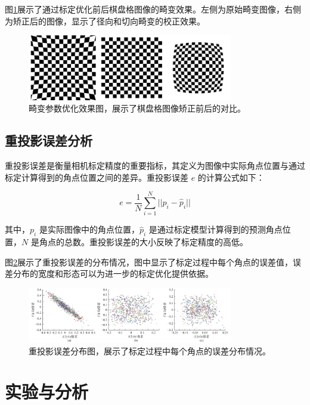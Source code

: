 \documentclass[hyperref,a4paper,UTF8]{ctexart}
\begin{document}
图\ref{fig:distortion_correction}展示了通过标定优化前后棋盘格图像的畸变效果。左侧为原始畸变图像，右侧为矫正后的图像，显示了径向和切向畸变的校正效果。

\begin{figure}[h]
    \centering
    \includegraphics[width=0.8\textwidth]{assets/checkerboard_distort_compare.png}
    \caption{畸变参数优化效果图，展示了棋盘格图像矫正前后的对比。}
    \label{fig:distortion_correction}
\end{figure}

\subsection{重投影误差分析}

重投影误差是衡量相机标定精度的重要指标，其定义为图像中实际角点位置与通过标定计算得到的角点位置之间的差异。重投影误差 $e$ 的计算公式如下：

\begin{equation}
    e = \frac{1}{N}\sum_{i=1}^{N} ||p_i - \hat{p}_i||
\end{equation}

其中，$p_i$ 是实际图像中的角点位置，$\hat{p}_i$ 是通过标定模型计算得到的预测角点位置，$N$ 是角点的总数。重投影误差的大小反映了标定精度的高低。

图\ref{fig:reprojection_error}展示了重投影误差的分布情况，图中显示了标定过程中每个角点的误差值，误差分布的宽度和形态可以为进一步的标定优化提供依据。

\begin{figure}[h]
    \centering
    \includegraphics[width=0.8\textwidth]{assets/重投影误差分布.jpg}
    \caption{重投影误差分布图，展示了标定过程中每个角点的误差分布情况。}
    \label{fig:reprojection_error}
\end{figure}

\section{实验与分析}
\end{document}
